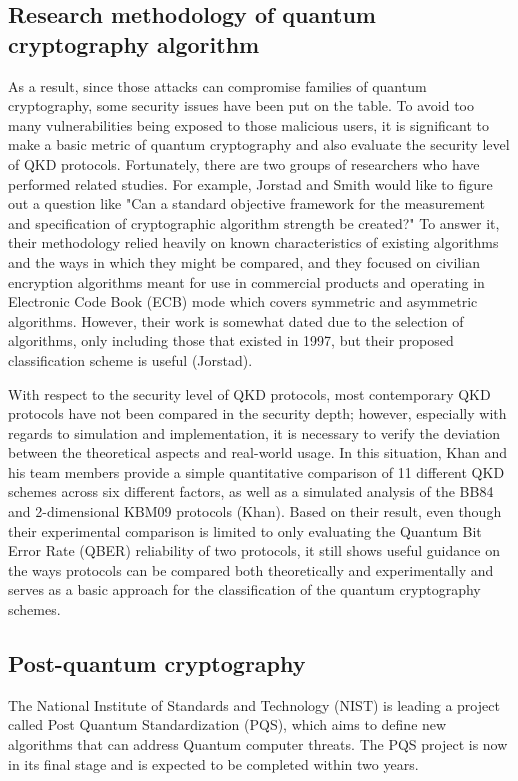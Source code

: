\documentclass[sigconf]{acmart}
\begin{document}
\subsection{Research methodology of quantum cryptography algorithm}
As a result, since those attacks can compromise families of quantum cryptography, some security issues have been put on the table.  To avoid too many vulnerabilities being exposed to those malicious users, it is significant to make a basic metric of quantum cryptography and also evaluate the security level of QKD protocols. Fortunately, there are two groups of researchers who have performed related studies. For example, Jorstad and Smith would like to figure out a question like "Can a standard objective framework for the measurement and specification of cryptographic algorithm strength be created?" To answer it, their methodology relied heavily on known characteristics of existing algorithms and the ways in which they might be compared, 
and they focused on civilian encryption algorithms meant for use in commercial products and operating in Electronic Code Book (ECB) mode which covers symmetric and asymmetric algorithms. However, their work is somewhat dated due to the selection of algorithms, only including those that existed in 1997, but their proposed classification scheme is useful (Jorstad).

With respect to the security level of QKD protocols, most contemporary QKD protocols have not been compared in the security depth; however, especially with regards to simulation and implementation, it is necessary to verify the deviation between the theoretical aspects and real-world usage. In this situation, Khan and his team members provide a simple quantitative comparison of 11 different QKD schemes across six different factors, as well as a simulated analysis of the BB84 and 2-dimensional KBM09 protocols (Khan). Based on their result, even though their experimental comparison is limited to only evaluating the Quantum Bit Error Rate (QBER) reliability of two protocols, it still shows useful guidance on the ways protocols can be compared both theoretically and experimentally and serves as a basic approach for the classification of the quantum cryptography schemes.

\subsection{Post-quantum cryptography}
The National Institute of Standards and Technology (NIST) is leading a project called Post Quantum Standardization (PQS), which aims to define new algorithms that can address Quantum computer threats. The PQS project is now in its final stage and is expected to be completed within two years.
\end{document}
